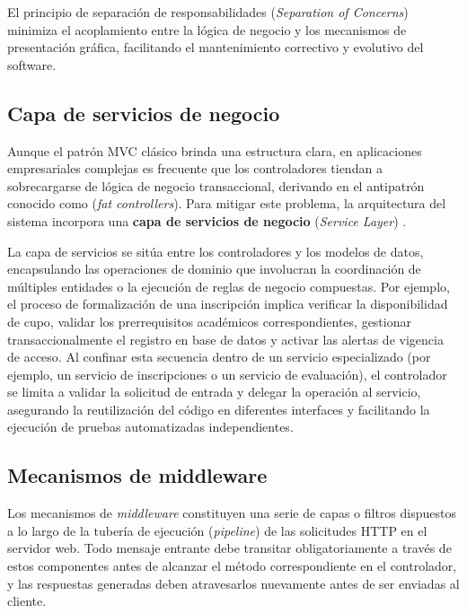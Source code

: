 El principio de separación de responsabilidades (\textit{Separation of Concerns}) minimiza el acoplamiento entre la lógica de negocio y los mecanismos de presentación gráfica, facilitando el mantenimiento correctivo y evolutivo del software.

\subsection{Capa de servicios de negocio}

Aunque el patrón MVC clásico brinda una estructura clara, en aplicaciones empresariales complejas es frecuente que los controladores tiendan a sobrecargarse de lógica de negocio transaccional, derivando en el antipatrón conocido como  (\textit{fat controllers}). Para mitigar este problema, la arquitectura del sistema incorpora una \textbf{capa de servicios de negocio} (\textit{Service Layer}) \cite{fowler2002patterns}.

La capa de servicios se sitúa entre los controladores y los modelos de datos, encapsulando las operaciones de dominio que involucran la coordinación de múltiples entidades o la ejecución de reglas de negocio compuestas. Por ejemplo, el proceso de formalización de una inscripción implica verificar la disponibilidad de cupo, validar los prerrequisitos académicos correspondientes, gestionar transaccionalmente el registro en base de datos y activar las alertas de vigencia de acceso. Al confinar esta secuencia dentro de un servicio especializado (por ejemplo, un servicio de inscripciones o un servicio de evaluación), el controlador se limita a validar la solicitud de entrada y delegar la operación al servicio, asegurando la reutilización del código en diferentes interfaces y facilitando la ejecución de pruebas automatizadas independientes.

\subsection{Mecanismos de middleware}

Los mecanismos de \textit{middleware} constituyen una serie de capas o filtros dispuestos a lo largo de la tubería de ejecución (\textit{pipeline}) de las solicitudes HTTP en el servidor web. Todo mensaje entrante debe transitar obligatoriamente a través de estos componentes antes de alcanzar el método correspondiente en el controlador, y las respuestas generadas deben atravesarlos nuevamente antes de ser enviadas al cliente.

